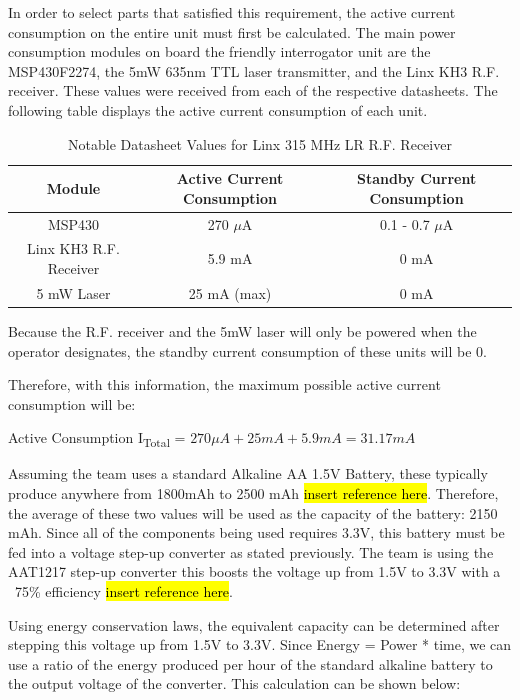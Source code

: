 \documentclass[letterpaper,10pt]{article}
\begin{document}
\begin{spacing}{1.15}
In order to select parts that satisfied this requirement, the active current consumption on the entire unit must first be calculated. The main power consumption modules on board the friendly interrogator unit are the MSP430F2274, the 5mW 635nm TTL laser transmitter, and the Linx KH3 R.F. receiver. These values were received from each of the respective datasheets. The following table displays the active current consumption of each unit. 


\begin{table}[htbp]
	\centering
	\begin{tabular}{c|c|c}	%
		\toprule	%
		Module & Active Current Consumption & Standby Current Consumption\\
		\midrule
		MSP430 & 270 $\mu$A & 0.1 - 0.7 $\mu$A\\ 
		Linx KH3 R.F. Receiver & 5.9 mA & 0 mA\\
		5 mW Laser & 25 mA (max) & 0 mA \\
	\bottomrule	%
	\end{tabular}%
	\caption{Notable Datasheet Values for Linx 315 MHz LR R.F. Receiver}
	\label{tab:table2}	%
\end{table}%

Because the R.F. receiver and the 5mW laser will only be powered when the operator designates, the standby current consumption of these units will be 0.

Therefore, with this information, the maximum possible active current consumption will be:
\begin{center}{Active Consumption I\textsubscript{Total} = $270 \mu A + 25 mA + 5.9 mA = 31.17 mA $}\end{center}

Assuming the team uses a standard Alkaline AA 1.5V Battery, these typically produce anywhere from 1800mAh to 2500 mAh \hl{insert reference here}. Therefore, the average of these two values will be used as the capacity of the battery: 2150 mAh. Since all of the components being used requires 3.3V, this battery must be fed into a voltage step-up converter as stated previously. The team is using the AAT1217 step-up converter this boosts the voltage up from 1.5V to 3.3V with a ~75\% efficiency \hl{insert reference here}.

Using energy conservation laws, the equivalent capacity can be determined after stepping this voltage up from 1.5V to 3.3V. Since Energy = Power * time, we can use a ratio of the energy produced per hour of the standard alkaline battery to the output voltage of the converter. This calculation can be shown below:


\end{spacing}
\end{document}
